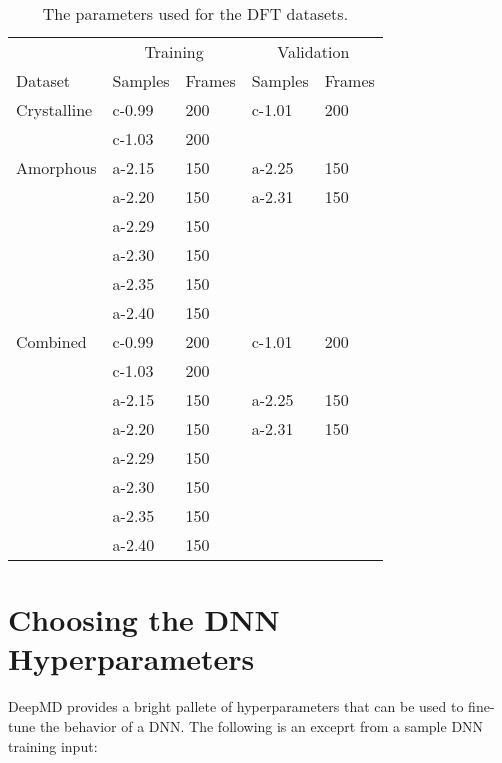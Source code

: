 
\begin{table}
  \begin{tabularx}{\textwidth}{lllll}
    \toprule
    \multicolumn{1}{c}{} & \multicolumn{2}{c}{Training} & \multicolumn{2}{c}{Validation} \\
    Dataset & Samples & Frames & Samples & Frames \\
    \midrule
    Crystalline & c-0.99 & 200 & c-1.01 & 200 \\
     & c-1.03 & 200 & & \\
    \midrule
    Amorphous & a-2.15 & 150 & a-2.25 & 150 \\
     & a-2.20 & 150 & a-2.31 & 150 \\
     & a-2.29 & 150 & & \\
     & a-2.30 & 150 & & \\
     & a-2.35 & 150 & & \\
     & a-2.40 & 150 & & \\
    \midrule
    Combined & c-0.99 & 200 & c-1.01 & 200 \\
     & c-1.03 & 200 & & \\
     & a-2.15 & 150 & a-2.25 & 150 \\
     & a-2.20 & 150 & a-2.31 & 150 \\
     & a-2.29 & 150 & & \\
     & a-2.30 & 150 & & \\
     & a-2.35 & 150 & & \\
     & a-2.40 & 150 & & \\
    \bottomrule
  \end{tabularx}
  \caption{The parameters used for the DFT datasets.}
  \label{tab:datasets}
\end{table}


\section{Choosing the DNN Hyperparameters}

DeepMD provides a bright pallete of hyperparameters that can be used to
fine-tune the behavior of a DNN. The following is an exceprt from a sample DNN
training input:


